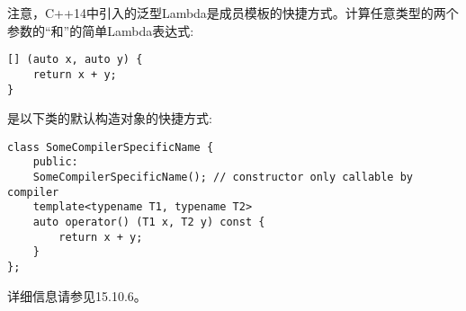 
注意，C++14中引入的泛型Lambda是成员模板的快捷方式。计算任意类型的两个参数的“和”的简单Lambda表达式:

\begin{lstlisting}[style=styleCXX]
[] (auto x, auto y) {
	return x + y;
}
\end{lstlisting}

是以下类的默认构造对象的快捷方式:

\begin{lstlisting}[style=styleCXX]
class SomeCompilerSpecificName {
	public:
	SomeCompilerSpecificName(); // constructor only callable by compiler
	template<typename T1, typename T2>
	auto operator() (T1 x, T2 y) const {
		return x + y;
	}
};
\end{lstlisting}

详细信息请参见15.10.6。







